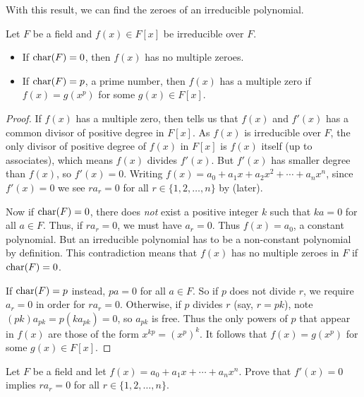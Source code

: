 With this result, we can find the zeroes of an irreducible polynomial.
\begin{theorem}\label{thrm-zeroes-of-an-irreducible}
    Let $F$ be a field and $f(x) \in F[x]$ be irreducible over $F$.
    \begin{itemize}
        \item If $\mathrm{char}(F) = 0$, then $f(x)$ has no multiple zeroes.
        \item If $\mathrm{char}(F) = p$, a prime number, then $f(x)$ has a multiple zero if $f(x) = g(x^p)$ for some $g(x) \in F[x]$.
    \end{itemize}
\end{theorem}
\begin{proof}
    If $f(x)$ has a multiple zero, then  tells us that $f(x)$ and $f'(x)$ has a common divisor of positive degree in $F[x]$. As $f(x)$ is irreducible over $F$, the only divisor of positive degree of $f(x)$ in $F[x]$ is $f(x)$ itself (up to associates), which means $f(x)$ divides $f'(x)$. But $f'(x)$ has smaller degree than $f(x)$, so $f'(x) = 0$. Writing $f(x) = a_0 + a_1x + a_2x^2 + \cdots + a_nx^n$, since $f'(x) = 0$ we see $ra_r = 0$ for all $r \in \{1, 2, \dots, n\}$ by  (later).

    Now if $\mathrm{char}(F) = 0$, there does \textit{not} exist a positive integer $k$ such that $ka = 0$ for all $a \in F$. Thus, if $ra_r = 0$, we must have $a_r = 0$. Thus $f(x) = a_0$, a constant polynomial. But an irreducible polynomial has to be a non-constant polynomial by definition. This contradiction means that $f(x)$ has no multiple zeroes in $F$ if $\mathrm{char}(F) = 0$.

    If $\mathrm{char}(F) = p$ instead, $pa = 0$ for all $a \in F$. So if $p$ does not divide $r$, we require $a_r = 0$ in order for $ra_r = 0$. Otherwise, if $p$ divides $r$ (say, $r = pk$), note $(pk)a_{pk} = p(ka_{pk}) = 0$, so $a_{pk}$ is free. Thus the only powers of $p$ that appear in $f(x)$ are those of the form $x^{kp} = \left(x^p\right)^k$. It follows that $f(x) = g(x^p)$ for some $g(x) \in F[x]$.
\end{proof}

\begin{exercise}\label{exercise-derivative-is-zero-implies-higher-terms-are-zero}
    Let $F$ be a field and let $f(x) = a_0 + a_1x + \cdots + a_nx^n$. Prove that $f'(x) = 0$ implies $ra_r = 0$ for all $r \in \{1, 2, \dots, n\}$.
\end{exercise}

